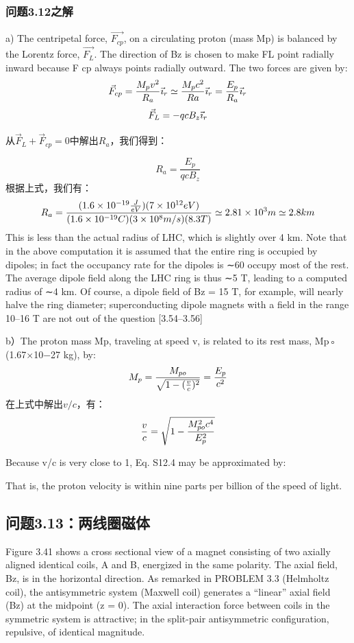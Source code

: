 \subsubsection{问题3.12之解}
a) The centripetal force, $\vec{F_{cp}}$, on a circulating proton (mass Mp) is balanced by
the Lorentz force, $\vec{F_L}$. The direction of Bz is chosen to make FL point radially
inward because F
cp always points radially outward. The two forces are given by:
$$
\vec{F}_{cp}=\frac{M_{p}v^{2}}{R_{a}}\vec{\imath}_{r}\simeq\frac{M_{p}c^{2}}{Ra}\vec{\imath}_{r}=\frac{E_{p}}{R_{a}}\vec{\imath}_{r}\\%
$$
$$
\vec{F}_{L}=-qcB_{z}\vec{\imath}_{r}\\%
$$

从$\vec{F}_{L}+\vec{F}_{cp}=0$中解出$R_a$，我们得到：

$$
R_a=\frac{E_p}{q c B_z} %
$$
根据上式，我们有：
$$
R_{a}=\frac{(1.6\times10^{-19}\frac{J}{eV})(7\times10^{12}eV)}{(1.6\times10^{-19}C)(3\times10^{8}m/s)(8.3T)}\\
\simeq2.81\times10^{3}m\simeq2.8km\\
$$
This is less than the actual radius of LHC, which is slightly over 4 km. Note that in
the above computation it is assumed that the entire ring is occupied by dipoles; in
fact the occupancy rate for the dipoles is ∼60%
occupy most of the rest. The average dipole field along the LHC ring is thus ∼5 T,
leading to a computed radius of ∼4 km. Of course, a dipole field of Bz = 15 T,
for example, will nearly halve the ring diameter; superconducting dipole magnets
with a field in the range 10–16 T are not out of the question [3.54–3.56]

b）The proton mass Mp, traveling at speed v, is related to its rest mass, Mp◦
(1.67×10−27 kg), by:
$$
M_{p}=\frac{M_{po}}{\sqrt{1-(\frac{v}{c})^{2}}}=\frac{E_{p}}{c^{2}}\\%
$$
在上式中解出$v/c$，有：
$$
\frac{v}{c}=\sqrt{1-\frac{M_{po}^{2}c^{4}}{E_{p}^{2}}}\\%
$$

Because v/c is very close to 1, Eq. S12.4 may be approximated by:

That is, the proton velocity is within nine parts per billion of the speed of light.
\newpage



\subsection{问题3.13：两线圈磁体}
Figure 3.41 shows a cross sectional view of a magnet consisting of two axially
aligned identical coils, A and B, energized in the same polarity. The axial field,
Bz, is in the horizontal direction. As remarked in PROBLEM 3.3 (Helmholtz coil),
the antisymmetric system (Maxwell coil) generates a “linear” axial field (Bz) at
the midpoint (z = 0). The axial interaction force between coils in the symmetric
system is attractive; in the split-pair antisymmetric configuration, repulsive, of
identical magnitude.

